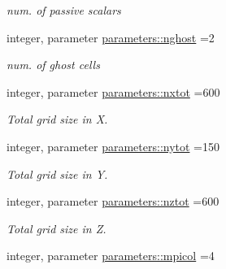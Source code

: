 \begin{DoxyCompactItemize}
\begin{DoxyCompactList}\small\item\em num. of passive scalars \end{DoxyCompactList}\item 
\hypertarget{namespaceparameters_a30c7f7c0e13eedb6214b5d6de69a9a13}{}integer, parameter \hyperlink{namespaceparameters_a30c7f7c0e13eedb6214b5d6de69a9a13}{parameters\+::nghost} =2\label{namespaceparameters_a30c7f7c0e13eedb6214b5d6de69a9a13}

\begin{DoxyCompactList}\small\item\em num. of ghost cells \end{DoxyCompactList}\item 
\hypertarget{namespaceparameters_a40b20d533d3bf5defbb402e4ed4f26f1}{}integer, parameter \hyperlink{namespaceparameters_a40b20d533d3bf5defbb402e4ed4f26f1}{parameters\+::nxtot} =600\label{namespaceparameters_a40b20d533d3bf5defbb402e4ed4f26f1}

\begin{DoxyCompactList}\small\item\em Total grid size in X. \end{DoxyCompactList}\item 
\hypertarget{namespaceparameters_aa0fce0eedffad5d18a2c54406babd6a0}{}integer, parameter \hyperlink{namespaceparameters_aa0fce0eedffad5d18a2c54406babd6a0}{parameters\+::nytot} =150\label{namespaceparameters_aa0fce0eedffad5d18a2c54406babd6a0}

\begin{DoxyCompactList}\small\item\em Total grid size in Y. \end{DoxyCompactList}\item 
\hypertarget{namespaceparameters_a06bfa99536c53df3ef70fded1d563c3b}{}integer, parameter \hyperlink{namespaceparameters_a06bfa99536c53df3ef70fded1d563c3b}{parameters\+::nztot} =600\label{namespaceparameters_a06bfa99536c53df3ef70fded1d563c3b}

\begin{DoxyCompactList}\small\item\em Total grid size in Z. \end{DoxyCompactList}\item 
\hypertarget{namespaceparameters_a5cf63ae056650e314df11497f8b13e28}{}integer, parameter \hyperlink{namespaceparameters_a5cf63ae056650e314df11497f8b13e28}{parameters\+::mpicol} =4\label{namespaceparameters_a5cf63ae056650e314df11497f8b13e28}


\end{DoxyCompactItemize}
